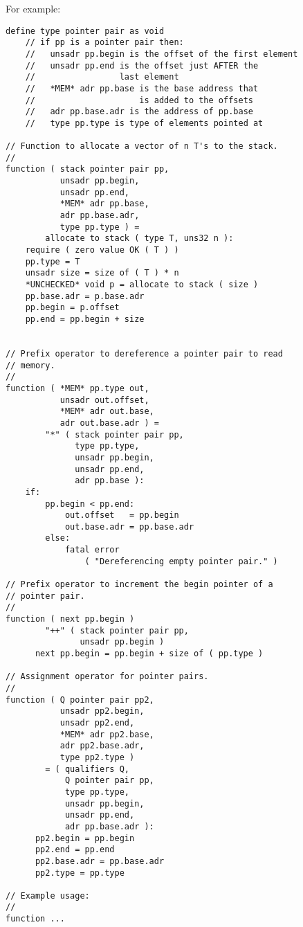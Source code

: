 \documentclass[12pt]{article}
\newenvironment{indpar}[1][0.3in]%
	{\begin{list}{}%
		     {\setlength{\itemsep}{0in}%
		      \setlength{\topsep}{0in}%
		      \setlength{\parsep}{1ex}%
		      \setlength{\labelwidth}{#1}%
		      \setlength{\leftmargin}{#1}%
		      \addtolength{\leftmargin}{\labelsep}}%
	 \item}%
	{\end{list}}
\begin{document}
For example:
\begin{indpar}\begin{verbatim}
define type pointer pair as void
    // if pp is a pointer pair then:
    //   unsadr pp.begin is the offset of the first element
    //   unsadr pp.end is the offset just AFTER the
    //                 last element
    //   *MEM* adr pp.base is the base address that
    //                     is added to the offsets
    //   adr pp.base.adr is the address of pp.base
    //   type pp.type is type of elements pointed at

// Function to allocate a vector of n T's to the stack.
//
function ( stack pointer pair pp,
           unsadr pp.begin,
           unsadr pp.end,
           *MEM* adr pp.base,
           adr pp.base.adr,
           type pp.type ) =
        allocate to stack ( type T, uns32 n ):
    require ( zero value OK ( T ) )
    pp.type = T
    unsadr size = size of ( T ) * n
    *UNCHECKED* void p = allocate to stack ( size )
    pp.base.adr = p.base.adr
    pp.begin = p.offset
    pp.end = pp.begin + size


// Prefix operator to dereference a pointer pair to read
// memory.
//
function ( *MEM* pp.type out,
           unsadr out.offset,
           *MEM* adr out.base,
           adr out.base.adr ) =
        "*" ( stack pointer pair pp,
              type pp.type,
              unsadr pp.begin,
              unsadr pp.end,
              adr pp.base ):
    if:
        pp.begin < pp.end:
            out.offset   = pp.begin
            out.base.adr = pp.base.adr
        else:
            fatal error
                ( "Dereferencing empty pointer pair." )

// Prefix operator to increment the begin pointer of a
// pointer pair.
//
function ( next pp.begin )
        "++" ( stack pointer pair pp,
               unsadr pp.begin )
      next pp.begin = pp.begin + size of ( pp.type )

// Assignment operator for pointer pairs.
//
function ( Q pointer pair pp2,
           unsadr pp2.begin,
           unsadr pp2.end,
           *MEM* adr pp2.base,
           adr pp2.base.adr,
           type pp2.type )
        = ( qualifiers Q,
            Q pointer pair pp,
            type pp.type,
            unsadr pp.begin,
            unsadr pp.end,
            adr pp.base.adr ):
      pp2.begin = pp.begin
      pp2.end = pp.end
      pp2.base.adr = pp.base.adr
      pp2.type = pp.type

// Example usage:
//
function ...


\end{verbatim}
\end{indpar}
\end{document}
